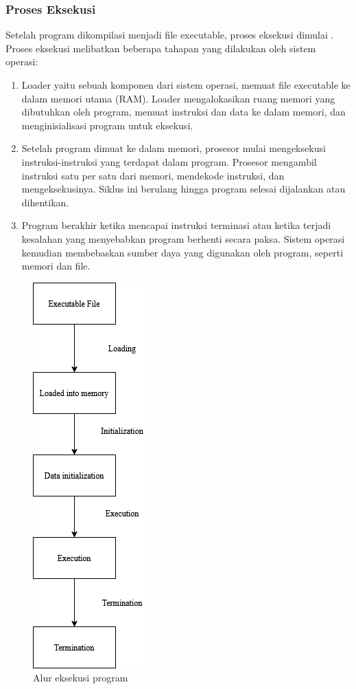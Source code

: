 \subsubsection{Proses Eksekusi}
Setelah program dikompilasi menjadi file executable, proses eksekusi dimulai \cite{Dan24}. Proses eksekusi melibatkan beberapa tahapan yang dilakukan oleh sistem operasi:
\begin{enumerate}
	\item {} Loader yaitu sebuah komponen dari sistem operasi, memuat file executable ke dalam memori utama (RAM). Loader mengalokasikan ruang memori yang dibutuhkan oleh program, memuat instruksi dan data ke dalam memori, dan menginisialisasi program untuk eksekusi.
	\item {} Setelah program dimuat ke dalam memori, prosesor mulai mengeksekusi instruksi-instruksi yang terdapat dalam program. Prosesor mengambil instruksi satu per satu dari memori, mendekode instruksi, dan mengeksekusinya. Siklus ini berulang hingga program selesai dijalankan atau dihentikan.
	\item {} Program berakhir ketika mencapai instruksi terminasi atau ketika terjadi kesalahan yang menyebabkan program berhenti secara paksa. Sistem operasi kemudian membebaskan sumber daya yang digunakan oleh program, seperti memori dan file.
\end{enumerate}

\begin{figure}
	\centering
	\includegraphics[height=0.4\textheight]
	{assets/pics/program_execution.png}
	\caption{Alur eksekusi program \cite{Dan24}}
\end{figure}


